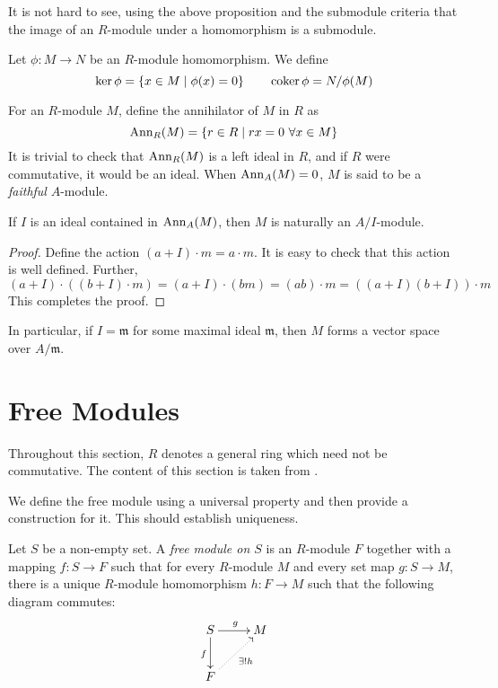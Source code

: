 It is not hard to see, using the above proposition and the submodule criteria that the image of an $R$-module under a homomorphism is a submodule.


\begin{definition}
    Let $\phi:M\to N$ be an $R$-module homomorphism. We define 
    \begin{equation*}
        \ker\phi = \{x\in M\mid\phi(x) = 0\}\qquad\operatorname{coker}\phi = N/\phi(M)
    \end{equation*}
\end{definition}

For an $R$-module $M$, define the annihilator of $M$ in $R$ as 
\begin{equation*}
    \operatorname{Ann}_R(M) = \{r\in R\mid rx = 0~\forall x\in M\}
\end{equation*}
It is trivial to check that $\operatorname{Ann}_R(M)$ is a left ideal in $R$, and if $R$ were commutative, it would be an ideal. When $\operatorname{Ann}_A(M) = 0$, $M$ is said to be a \textit{faithful} $A$-module.

\begin{proposition}
    If $I$ is an ideal contained in $\operatorname{Ann}_A(M)$, then $M$ is naturally an $A/I$-module.
\end{proposition}
\begin{proof}
    Define the action $(a + I)\cdot m = a\cdot m$. It is easy to check that this action is well defined. Further, 
    \begin{equation*}
        (a + I)\cdot((b + I)\cdot m) = (a + I)\cdot(bm) = (ab)\cdot m = ((a + I)(b + I))\cdot m
    \end{equation*}
    This completes the proof.
\end{proof}

In particular, if $I = \mathfrak m$ for some maximal ideal $\mathfrak m$, then $M$ forms a vector space over $A/\mathfrak m$.

\section{Free Modules}
Throughout this section, $R$ denotes a general ring which need not be commutative. The content of this section is taken from \cite{blyth}. 

We define the free module using a universal property and then provide a construction for it. This should establish uniqueness.

\begin{definition}
    Let $S$ be a non-empty set. A \textit{free module on $S$} is an $R$-module $F$ together with a mapping $f: S\to F$ such that for every $R$-module $M$ and every set map $g: S\to M$, there is a unique $R$-module homomorphism $h: F\to M$ such that the following diagram commutes: 
    \begin{equation*}
    \xymatrix{
        S\ar[r]^g\ar[d]_f & M\\
        F\ar@{.>}[ru]_{\exists! h}
    }
    \end{equation*}
\end{definition}

